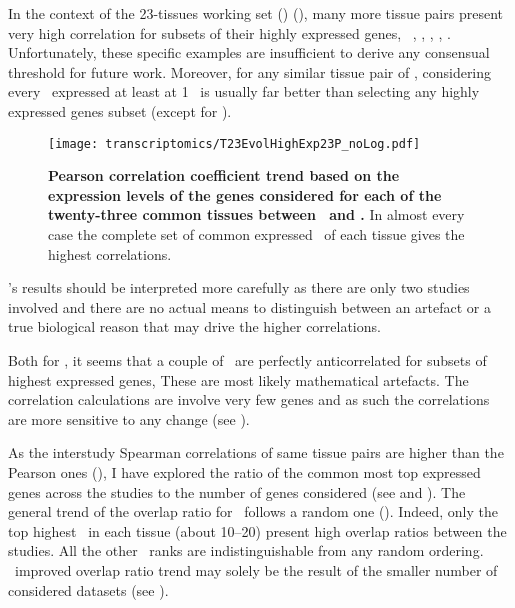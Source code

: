 In the context of the 23-tissues working set (\setTwo) (),
many more tissue pairs present very high correlation for subsets of their highly
expressed genes, \ie\ \skeletal, \Thyroid, \Cortex, \Uterus, \Kidney.
Unfortunately, these specific examples are insufficient
to derive any consensual threshold for future work.
Moreover,
for any similar tissue pair of \setTwo,
considering every \pcg\ expressed at least at 1 \FPKM\ is usually
far better than selecting any highly expressed genes subset
(except for \kidney).

\begin{figure}[!htpb]
    \texttt{[image: transcriptomics/T23EvolHighExp23P\_noLog.pdf]}\centering
    \vspace{-3mm}
    \caption[Pearson correlation coefficient trend based on the expression
    levels of the genes considered for each of the 23 common tissues]{%
\label{fig:CorHighExp23T}\textbf{Pearson correlation coefficient trend based
on the expression levels of the genes considered
for each of the twenty-three common tissues between \uhlen\ and \gtex.}
In almost every case the complete set of common expressed \pcgs\ of each tissue gives
the highest correlations.}
\end{figure}

\setTwo{}'s results should be interpreted more carefully as
there are only two studies involved and
there are no actual means to distinguish
between an artefact or a true biological reason
that may drive the higher correlations.

Both for ,
it seems that a couple of \treps\ are perfectly anticorrelated
for subsets of highest expressed genes,
These are most likely mathematical artefacts.
The correlation calculations are involve very few genes
and as such the correlations are more sensitive to any change
(see ).

As the interstudy Spearman correlations of same tissue pairs
are higher than the Pearson ones (),
I have explored the ratio of the common most top expressed
genes across the studies to the number of genes considered
(see  and ).
The general trend of the overlap ratio for \setOne\ follows a random one
().
Indeed, only the top highest \pcgs\ in each tissue (about 10--20)
present high overlap ratios between the studies.
All the other \pcg\ ranks are indistinguishable from any random ordering.
\setTwo\ improved overlap ratio trend may solely be
the result of the smaller number of considered datasets
(see ).

